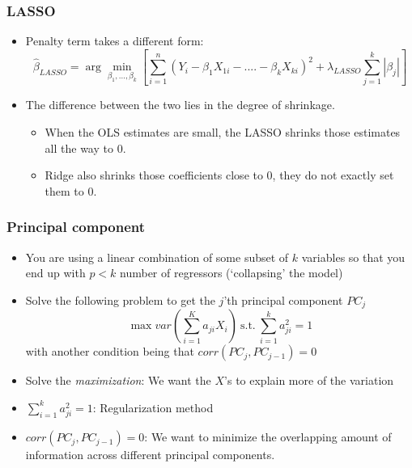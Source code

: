 \documentclass[aspectratio=169]{beamer}
\begin{document}
\begin{frame}
\frametitle{LASSO}
\begin{itemize}
\item Penalty term takes a different form: 
\[
\hat{\beta}_{LASSO}=\arg\min_{\beta_1,...,\beta_k}\left[ \sum_{i=1}^n(Y_i - \beta_1X_{1i}-....-\beta_kX_{ki})^2 + \lambda_{LASSO}\sum_{j=1}^k |\beta_j|\right]
\]
\item The difference between the two lies in the degree of shrinkage. 
\begin{itemize}
\item When the OLS estimates are small, the LASSO shrinks those estimates all the way to 0. 
\item Ridge also shrinks those coefficients close to 0, they do not exactly set them to 0. 
\end{itemize}
\end{itemize}
\end{frame}

\begin{frame}
\frametitle{Principal component}
\begin{itemize}
\item You are using a linear combination of some subset of $k$ variables so that you end up with $p<k$ number of regressors (`collapsing' the model)
\item Solve the following problem to get the $j$'th principal component $PC_j$
\[
\max var\left(\sum_{i=1}^Ka_{ji}X_i\right)\  \text{s.t.}\ \sum_{i=1}^ka_{ji}^2=1
\]
with another condition being that $corr(PC_j,PC_{j-1})=0$
\item Solve the \textit{maximization}: We want the $X$'s to explain more of the variation
\item $\sum_{i=1}^ka_{ji}^2=1$: Regularization method
\item $corr(PC_j,PC_{j-1})=0$: We want to minimize the overlapping amount of information across different principal components.
\end{itemize}
\end{frame}
\end{document}
